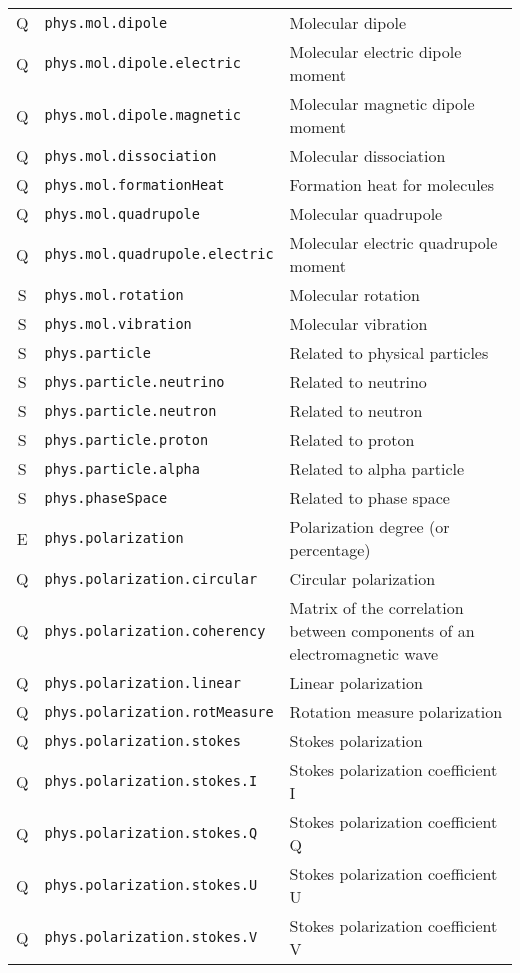 \documentclass[11pt,a4paper]{ivoa}
\begin{document}
\begin{longtable}[h!]{c|p{40ex}|p{}}
Q & {\tt phys.mol.dipole} & Molecular dipole\\
Q & {\tt phys.mol.dipole.electric} & Molecular electric dipole moment\\
Q & {\tt phys.mol.dipole.magnetic} & Molecular magnetic dipole moment\\
Q & {\tt phys.mol.dissociation} & Molecular dissociation\\
Q & {\tt phys.mol.formationHeat} & Formation heat for molecules\\
Q & {\tt phys.mol.quadrupole} & Molecular quadrupole\\
Q & {\tt phys.mol.quadrupole.electric} & Molecular electric quadrupole moment\\
S & {\tt phys.mol.rotation} & Molecular rotation\\
S & {\tt phys.mol.vibration} & Molecular vibration\\
S & {\tt phys.particle} & Related to physical particles\\
S & {\tt phys.particle.neutrino} & Related to neutrino\\
S & {\tt phys.particle.neutron} & Related to neutron\\
S & {\tt phys.particle.proton} & Related to proton\\
S & {\tt phys.particle.alpha} & Related to alpha particle\\
S & {\tt phys.phaseSpace} & Related to phase space\\
E & {\tt phys.polarization} & Polarization degree (or percentage)\\
Q & {\tt phys.polarization.circular} & Circular polarization\\
Q & {\tt phys.polarization.coherency} & Matrix of the correlation between components of an electromagnetic wave\\
Q & {\tt phys.polarization.linear} & Linear polarization\\
Q & {\tt phys.polarization.rotMeasure} & Rotation measure polarization\\
Q & {\tt phys.polarization.stokes} & Stokes polarization\\
Q & {\tt phys.polarization.stokes.I} & Stokes polarization coefficient I\\
Q & {\tt phys.polarization.stokes.Q} & Stokes polarization coefficient Q\\
Q & {\tt phys.polarization.stokes.U} & Stokes polarization coefficient U\\
Q & {\tt phys.polarization.stokes.V} & Stokes polarization coefficient V\\

\end{longtable}
\end{document}
